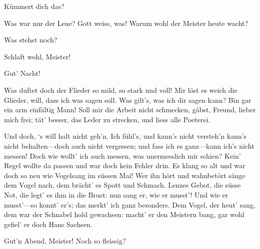 \begin{drama}
\Sachsspeaks
Kümmert dich das?

\Davidspeaks


Was war nur der Lene? Gott weiss, was!
Warum wohl der Meister heute wacht?

\Sachsspeaks
Was stehst noch?

\Davidspeaks
Schlaft wohl, Meister!

\Sachsspeaks
Gut' Nacht!




\Sachsspeaks


Was duftet doch der Flieder
so mild, so stark und voll!
Mir löst es weich die Glieder,
will, dass ich was sagen soll.
Was gilt's, was ich dir sagen kann?
Bin gar ein arm einfältig Mann!
Soll mir die Arbeit nicht schmecken,
gäbst, Freund, lieber mich frei;
tät' besser, das Leder zu strecken,
und liess alle Poeterei.


Und doch, ‘s will halt nicht geh'n.
Ich fühl's, und kann's nicht versteh'n
kann's nicht behalten---doch auch nicht vergessen;
und fass ich es ganz---kann ich's nicht messen!
Doch wie wollt' ich auch messen,
was unermesslich mir schien?
Kein' Regel wollte da passen
und war doch kein Fehler drin.
Es klang so alt und war doch so neu
wie Vogelsang im süssen Mai!
Wer ihn hört und wahnbetört
sänge dem Vogel nach,
dem brächt' es Spott und Schmach.
Lenzes Gebot, die süsse Not,
die legt' es ihm in die Brust:
nun sang er, wie er musst'!
Und wie er musst'---so konnt' er's;
das merkt' ich ganz besonders.
Dem Vogel, der heut' sang,
dem war der Schnabel hold gewachsen:
macht' er den Meistern bang,
gar wohl gefiel' er doch Hans Sachsen.


\scene


\Evaspeaks
Gut'n Abend, Meister! Noch so fleissig?


\end{drama}
